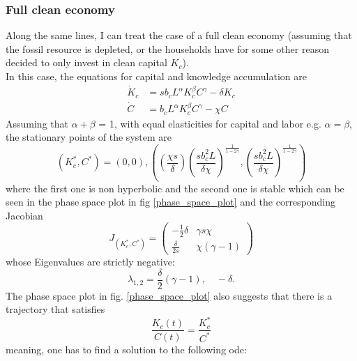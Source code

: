 \subsubsection{Full clean economy}
\label{sec:full_clean_economy}
Along the same lines, I can treat the case of a full clean economy (assuming that the fossil resource is depleted, or the households have for some other reason decided to only invest in clean capital $K_c$). \\
In this case, the equations for capital and knowledge accumulation are
\begin{subequations}
\begin{align}
    \dot{K}_c &= s b_c L^{\alpha} K_c^{\beta} C^\gamma - \delta K_c \label{eq:full_clean_ca1} \\
	\dot{C} &= b_c L^\alpha K_c^\beta C^\gamma - \chi C \label{eq:full_clean_ca2}
\end{align}
\end{subequations}
Assuming that $\alpha + \beta$ = 1, with equal elasticities for capital and labor e.g. $\alpha = \beta$, the stationary points of the system are 
\begin{equation}
  (K_c^*, C^*) = (0,0), \left( \left( \frac{\chi s}{\delta} \right) \left( \frac{s b_c^2 L}{\delta \chi} \right)^{\frac{1}{1-2\gamma}}, \left( \frac{s b_c^2 L}{\delta \chi} \right)^{\frac{1}{1-2 \gamma}}  \right)
	\label{stationary_points}
\end{equation}
where the first one is non hyperbolic and the second one is stable which can be seen in the phase space plot in fig \ref{phase_space_plot} and the corresponding Jacobian
\begin{equation}
	J_{(K_c^*,C^*)} = 
		\begin{pmatrix}
			-\frac{1}{2}\delta & \gamma s \chi \\
			\frac{\delta}{2 s} & \chi \left(\gamma-1 \right)
		\end{pmatrix}
	\label{eq:learning_jacobian}
\end{equation}
whose Eigenvalues are strictly negative:
\begin{equation}
  \lambda_{1,2} = \frac{\delta}{2}(\gamma-1), \quad -\delta.
	\label{eq:learning_eigenvalues}
\end{equation}
The phase space plot in fig. \ref{phase_space_plot} also suggests that there is a trajectory that satisfies 
\begin{equation}
	\frac{K_c(t)}{C(t)} = \frac{K^*_c}{C^*}
\end{equation}
meaning, one has to find a solution to the following ode:
